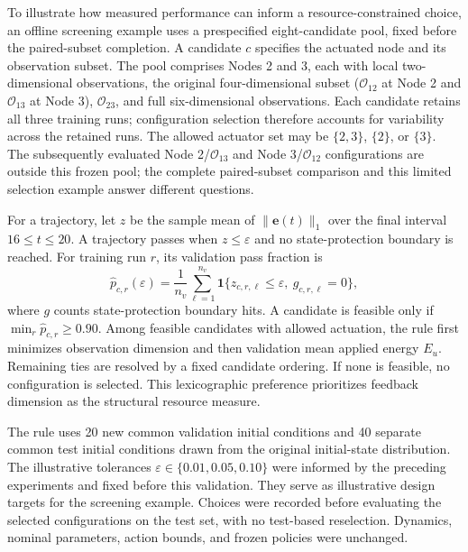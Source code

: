 To illustrate how measured performance can inform a resource-constrained choice, an offline screening example uses a prespecified eight-candidate pool, fixed before the paired-subset completion. A candidate $c$ specifies the actuated node and its observation subset. The pool comprises Nodes 2 and 3, each with local two-dimensional observations, the original four-dimensional subset ($\mathcal O_{12}$ at Node 2 and $\mathcal O_{13}$ at Node 3), $\mathcal O_{23}$, and full six-dimensional observations. Each candidate retains all three training runs; configuration selection therefore accounts for variability across the retained runs. The allowed actuator set may be $\{2,3\}$, $\{2\}$, or $\{3\}$. The subsequently evaluated Node 2/$\mathcal O_{13}$ and Node 3/$\mathcal O_{12}$ configurations are outside this frozen pool; the complete paired-subset comparison and this limited selection example answer different questions.

For a trajectory, let $z$ be the sample mean of $\|\mathbf e(t)\|_1$ over the final interval $16\leq t\leq20$. A trajectory passes when $z\leq\varepsilon$ and no state-protection boundary is reached. For training run $r$, its validation pass fraction is
\begin{equation}
 \widehat p_{c,r}(\varepsilon)
 =\frac{1}{n_v}\sum_{\ell=1}^{n_v}
 \mathbf 1\{z_{c,r,\ell}\leq\varepsilon,\ g_{c,r,\ell}=0\},
 \label{eq:configuration_pass}
\end{equation}
where $g$ counts state-protection boundary hits. A candidate is feasible only if $\min_r\widehat p_{c,r}\geq0.90$. Among feasible candidates with allowed actuation, the rule first minimizes observation dimension and then validation mean applied energy $E_u$. Remaining ties are resolved by a fixed candidate ordering. If none is feasible, no configuration is selected. This lexicographic preference prioritizes feedback dimension as the structural resource measure.

The rule uses 20 new common validation initial conditions and 40 separate common test initial conditions drawn from the original initial-state distribution. The illustrative tolerances $\varepsilon\in\{0.01,0.05,0.10\}$ were informed by the preceding experiments and fixed before this validation. They serve as illustrative design targets for the screening example. Choices were recorded before evaluating the selected configurations on the test set, with no test-based reselection. Dynamics, nominal parameters, action bounds, and frozen policies were unchanged.

